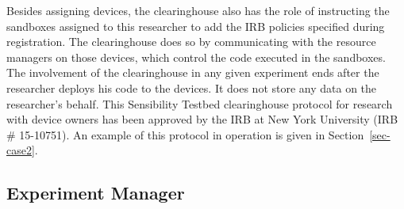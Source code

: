 Besides assigning devices, the clearinghouse also has the role of 
instructing the sandboxes assigned to this researcher to add the IRB 
policies specified during registration. The clearinghouse does so 
by communicating with the resource managers on those devices, which 
control the code executed in the sandboxes. The involvement of the 
clearinghouse in any given experiment ends 
after the researcher deploys his code to the devices. It does not store any
data on the researcher's behalf. 
This Sensibility Testbed clearinghouse 
protocol for research with device owners has been approved by
the IRB at New York University (IRB \# 15-10751). An example 
of this protocol in operation is given in Section~\ref{sec-case2}.


%




\subsection{Experiment Manager}\label{sec-emt}

